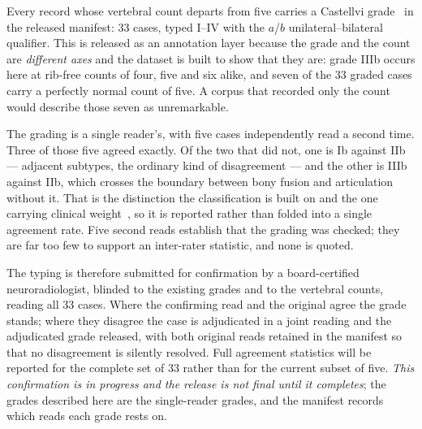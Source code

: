 \documentclass[aapm,mph,amsmath,amssymb,reprint,linenumbers]{revtex4-2}
\begin{document}
Every record whose vertebral count departs from five carries a Castellvi
grade~\cite{castellvi1984} in the released manifest: 33 cases, typed I--IV with the $a$/$b$
unilateral--bilateral qualifier. This is released as an
annotation layer because the grade and the count are \emph{different axes} and the dataset
is built to show that they are: grade IIIb occurs here at rib-free counts of four, five and
six alike, and seven of the 33 graded cases carry a perfectly normal count of five. A
corpus that recorded only the count would describe those seven as unremarkable.

The grading is a single reader's, with five cases independently read a second time. Three
of those five agreed exactly. Of the two that did not, one is Ib against IIb --- adjacent
subtypes, the ordinary kind of disagreement --- and the other is IIIb against IIb, which
crosses the boundary between bony fusion and articulation without it. That is the
distinction the classification is built on and the one carrying clinical
weight~\cite{koninwalz2010}, so it is reported rather than folded into a single agreement
rate. Five second reads establish that the grading was checked; they are far too few to
support an inter-rater statistic, and none is quoted.



The typing is therefore submitted for confirmation by a board-certified neuroradiologist,
blinded to the existing grades and to the vertebral counts, reading all 33 cases. Where the
confirming read and the original agree the grade stands; where they disagree the case is
adjudicated in a joint reading and the adjudicated grade released, with both original reads
retained in the manifest so that no disagreement is silently resolved. Full agreement
statistics will be reported for the complete set of 33 rather than for the current subset
of five. \emph{This confirmation is in progress and the release is not final until it
completes}; the grades described here are the single-reader grades, and the manifest
records which reads each grade rests on.
\end{document}
